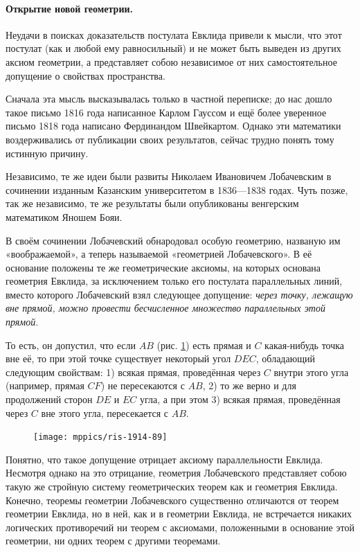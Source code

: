 \documentclass[twoside]{book}
\begin{document}
\paragraph{Открытие новой геометрии.}\label{1914/93} Неудачи в поисках доказательств
постулата Евклида привели к мысли, что этот постулат (как и любой ему равносильный) и не может быть выведен из других аксиом геометрии, а представляет собою независимое от них самостоятельное допущение о свойствах пространства.

Сначала эта мысль высказывалась только в частной переписке;
до нас дошло такое письмо 1816 года написанное Карлом Гауссом
и ещё более уверенное письмо 1818 года написано Фердинандом Швейкартом.
Однако эти математики воздерживались от публикации своих результатов, сейчас трудно понять тому истинную причину.

Независимо, те же идеи были развиты Николаем Ивановичем Лобачевским в 
сочинении изданным Казанским университетом в 1836—1838 годах.
Чуть позже, так же независимо, те же результаты были опубликованы венгерским математиком Яношем Бояи.

В своём сочинении Лобачевский обнародовал особую геометрию, названую им «воображаемой», а теперь называемой «геометрией Лобачевского».
В её основание положены те же геометрические аксиомы, на которых основана
геометрия Евклида, за исключением только его постулата параллельных линий, вместо которого Лобачевский взял следующее допущение:
\emph{через точку, лежащую вне прямой, можно провести бесчисленное множество параллельных этой прямой}.


То есть, он допустил, что если $AB$ (рис. \ref{1914/ris-89}) есть прямая и $C$ какая-нибудь точка вне её, то при этой точке существует некоторый угол $DEC$, обладающий следующим свойствам:
1) всякая прямая, проведённая через $C$ внутри этого угла (например, прямая $CF$) не пересекаются с $AB$,
2) то же верно и для продолжений сторон $DE$ и $EC$ угла,
а при этом 3) всякая прямая, проведённая через $C$ вне этого угла, пересекается с $AB$.

\begin{figure}
\centering
\texttt{[image: mppics/ris-1914-89]}
\caption{}\label{1914/ris-89}
\end{figure}

Понятно, что такое допущение отрицает аксиому параллельности Евклида.
Несмотря однако на это отрицание, геометрия Лобачевского представляет собою такую же стройную
систему геометрических теорем как и геометрия Евклида.
Конечно, теоремы геометрии Лобачевского существенно отличаются от теорем геометрии Евклида, но
в ней, как и в геометрии Евклида, не встречается никаких логических противоречий ни теорем с аксиомами, положенными в основание этой геометрии, ни одних теорем с другими теоремами.
\end{document}
